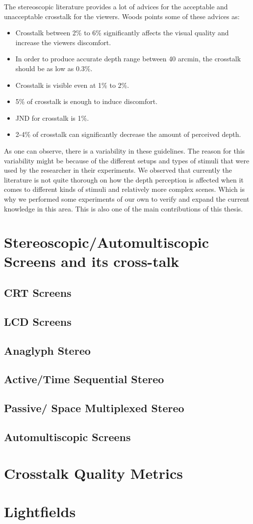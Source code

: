 The stereoscopic literature provides a lot of advices for the acceptable and unacceptable crosstalk for the viewers. Woods\cite{woods2012crosstalk} points some of these advices as:
\begin{itemize}
	\item Crosstalk between 2\% to 6\% significantly affects the visual quality and increase the viewers discomfort.
	\item In order to produce accurate depth range between 40 arcmin, the crosstalk should be as low as 0.3\%.
	\item Crosstalk is visible even at 1\% to 2\%.
	\item 5\% of crosstalk is enough to induce discomfort.
	\item JND for crosstalk is 1\%.
	\item 2-4\% of crosstalk can significantly decrease the amount of perceived depth.
\end{itemize}

As one can observe, there is a variability in these guidelines. The reason for this variability might be because of the different setups and types of stimuli that were used by the researcher in their experiments. We observed that currently the literature is not quite thorough on how the depth perception is affected when it comes to different kinds of stimuli and relatively more complex scenes. Which is why we performed some experiments of our own to verify and expand the current knowledge in this area. This is also one of the main contributions of this thesis.

\section{Stereoscopic/Automultiscopic Screens and its cross-talk}


\subsection{CRT Screens}
\subsection{LCD Screens}
\subsection{Anaglyph Stereo}
\subsection{Active/Time Sequential Stereo}
\subsection{Passive/ Space Multiplexed Stereo}
\subsection{Automultiscopic Screens}

\section{Crosstalk Quality Metrics}

\section{Lightfields}